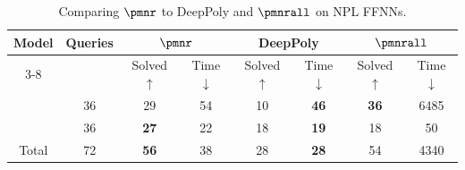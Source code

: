 \begin{table}[htb]
	\centering
	\caption{Comparing \(\pmnr\) to DeepPoly and \(\pmnrall\) on NPL FFNNs.}
	\begin{tabular}{|c|c|cc|cc|cc|}
		\hline
		\multirow{2}{*}{Model}         & \multirow{2}{*}{Queries}       &
		\multicolumn{2}{c|}{\(\pmnr\)} & \multicolumn{2}{c|}{DeepPoly}  & \multicolumn{2}{c|}{\(\pmnrall\)}                                                                                                                                                                \\ \cline{3-8}
		                               &                                & \multicolumn{1}{c|}{Solved \(\uparrow\)} & Time \(\downarrow\) & \multicolumn{1}{c|}{Solved \(\uparrow\)} & Time \(\downarrow\) & \multicolumn{1}{c|}{Solved \(\uparrow\)} & Time \(\downarrow\) \\ \hline
		\ReluBilinearSoftmax           & 36                             & \multicolumn{1}{c|}{29}                  & 54                  & \multicolumn{1}{c|}{10}                  & \textbf{46}         & \multicolumn{1}{c|}{\textbf{36}}         & 6485                \\ \hline
		\LeakyReluSigmoid              & 36                             & \multicolumn{1}{c|}{\textbf{27}}         & 22                  & \multicolumn{1}{c|}{18}                  & \textbf{19}         & \multicolumn{1}{c|}{18}                  & 50                  \\ \hline
		Total                          & 72                             & \multicolumn{1}{c|}{\textbf{56}}         & 38                  & \multicolumn{1}{c|}{28}                  & \textbf{28}         & \multicolumn{1}{c|}{54}                  & 4340                \\ \hline
	\end{tabular}
	\label{tab:results-npl}
\end{table}